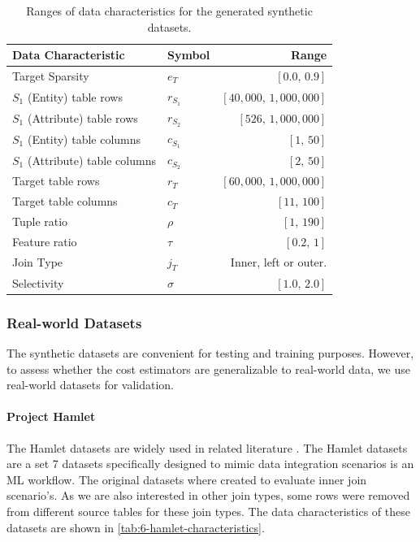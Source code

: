 \begin{table}[ht]
  \centering
  \begin{tabular}{llr}
    \toprule
    Data Characteristic             & Symbol    & Range                              \\ \midrule \midrule
    Target Sparsity                 & $e_T$     & $[ 0.0\text{,\ \ } 0.9]$           \\
    $S_1$ (Entity) table rows       & $r_{S_1}$ & $[ 40,000\text{,\ \ } 1,000,000]$  \\
    $S_1$ (Attribute) table rows    & $r_{S_2}$ & $[ 526\text{,\ \ } 1,000,000]$     \\
    $S_1$ (Entity) table columns    & $c_{S_1}$ & $[ 1\text{,\ \ } 50]$              \\
    $S_1$ (Attribute) table columns & $c_{S_2}$ & $[ 2\text{,\ \ } 50]$              \\
    Target table rows               & $r_T$     & $[ 60,000 \text{,\ \ } 1,000,000]$ \\
    Target table columns            & $c_T$     & $[ 11\text{,\ \ } 100]$            \\
    Tuple ratio                     & $\rho$    & $[ 1\text{,\ \ } 190]$             \\
    Feature ratio                   & $\tau$    & $[ 0.2\text{,\ \ } 1]$             \\
    Join Type                       & $j_T$     & Inner, left or outer.              \\
    Selectivity                     & $\sigma$  & $[ 1.0\text{,\ \ } 2.0]$           \\
    \bottomrule
  \end{tabular}
  \caption{Ranges of data characteristics for the generated synthetic datasets.}
  \label{tab:6-synthetic-dataset-characteristics}
\end{table}


\subsubsection{Real-world Datasets}
The synthetic datasets are convenient for testing and training purposes. However, to assess whether the cost estimators are generalizable to real-world data, we use real-world datasets for validation.

\paragraph{Project Hamlet \cite{2016-hamlet-sigmod}}
The Hamlet datasets are widely used in related literature \cite{2016-hamlet-sigmod, amalur, morpheus,orion_learning_gen_lin_models}. The Hamlet datasets are a set 7 datasets specifically designed to mimic data integration scenarios is an ML workflow. The original datasets where created to evaluate inner join scenario's. As we are also interested in other join types, some rows were removed from different source tables for these join types. The data characteristics of these datasets are shown in \autoref{tab:6-hamlet-characteristics}.

